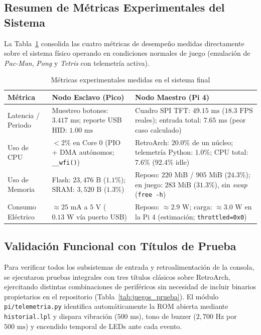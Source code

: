 \documentclass[conference]{IEEEtran}
\begin{document}
\subsection{Resumen de Métricas Experimentales del Sistema}
La Tabla~\ref{tab:metricas_finales} consolida las cuatro métricas de desempeño medidas directamente sobre el sistema físico operando en condiciones normales de juego (emulación de \textit{Pac-Man}, \textit{Pong} y \textit{Tetris} con telemetría activa).

\begin{table}[H]
	\centering
	\caption{Métricas experimentales medidas en el sistema final}
	\label{tab:metricas_finales}
	\footnotesize
	\begin{tabular}{|p{2.3cm}|p{2.5cm}|p{2.6cm}|}
		\hline
		\textbf{Métrica} & \textbf{Nodo Esclavo (Pico)} & \textbf{Nodo Maestro (Pi 4)} \\
		\hline
		Latencia / Periodo & Muestreo botones: $3.417\text{ ms}$; reporte USB HID: $1.00\text{ ms}$ & Cuadro SPI TFT: $49.15\text{ ms}$ ($18.3\text{ FPS}$ reales); entrada total: $7.65\text{ ms}$ (peor caso calculado) \\
		\hline
		Uso de CPU & $< 2\%$ en Core 0 (PIO + DMA autónomos; \texttt{\_\_wfi()}) & RetroArch: $20.0\%$ de un núcleo; telemetría Python: $1.0\%$; CPU total: $7.6\%$ ($92.4\%$ idle) \\
		\hline
		Uso de Memoria & Flash: $23{,}476\text{ B}$ ($1.1\%$); SRAM: $3{,}520\text{ B}$ ($1.3\%$) & Reposo: $220\text{ MiB}$ / $905\text{ MiB}$ ($24.3\%$); en juego: $283\text{ MiB}$ ($31.3\%$), sin \textit{swap} (\texttt{free -h}) \\
		\hline
		Consumo Eléctrico & $\approx 25\text{ mA}$ a $5\text{ V}$ ($0.13\text{ W}$ vía puerto USB) & Reposo: $\approx 2.9\text{ W}$; carga: $\approx 3.0\text{ W}$ en la Pi 4 (estimación; \texttt{throttled=0x0}) \\
		\hline
	\end{tabular}
\end{table}

\subsection{Validación Funcional con Títulos de Prueba}
Para verificar todos los subsistemas de entrada y retroalimentación de la consola, se ejecutaron pruebas integrales con tres títulos clásicos sobre RetroArch, ejercitando distintas combinaciones de periféricos sin necesidad de incluir binarios propietarios en el repositorio (Tabla~\ref{tab:juegos_prueba}). El módulo \texttt{pi/telemetria.py} identifica automáticamente la ROM abierta mediante \texttt{historial.lpl} y dispara vibración ($500\text{ ms}$), tono de buzzer ($2{,}700\text{ Hz}$ por $500\text{ ms}$) y encendido temporal de LEDs ante cada evento.
\end{document}
